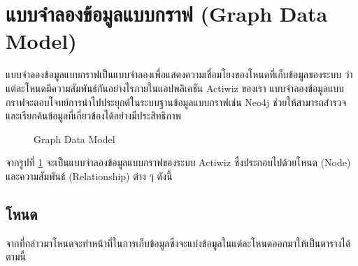 \documentclass[14pt,oneside,openright,a4paper]{cpe-thai-project}
\begin{document}
\section{แบบจำลองข้อมูลแบบกราฟ (Graph Data Model)}
แบบจำลองข้อมูลแบบกราฟเป็นแบบจำลองเพื่อแสดงความเชื่อมโยงของโหนดที่เก็บข้อมูลของระบบ ว่าแต่ละโหนดมีความสัมพันธ์กันอย่างไรภายในแอปพลิเคชัน Actiwiz ของเรา แบบจำลองข้อมูลแบบกราฟจะตอบโจทย์การนำไปประยุกต์ในระบบฐานข้อมูลแบบกราฟเช่น Neo4j ช่วยให้สามารถสำรวจและเรียกค้นข้อมูลที่เกี่ยวข้องได้อย่างมีประสิทธิภาพ
  \begin{figure}[!h]\centering
    \setlength{\fboxrule}{0.5mm} %
    \setlength{\fboxsep}{0.5cm}
    \caption{Graph Data Model}\label{fig:Graph Data Model}
  \end{figure}
  \FloatBarrier
จากรูปที่ \ref{fig:Graph Data Model} จะเป็นแบบจำลองข้อมูลแบบกราฟของระบบ Actiwiz ซึ่งประกอบไปด้วยโหนด (Node) และความสัมพันธ์ (Relationship) ต่าง ๆ ดังนี้
  \subsection{โหนด}
    จากที่กล่าวมาโหนดจะทำหน้าที่ในการเก็บข้อมูลซึ่งจะแบ่งข้อมูลในแต่ละโหนดออกมาให้เป็นตารางได้ตามนี้
\end{document}

